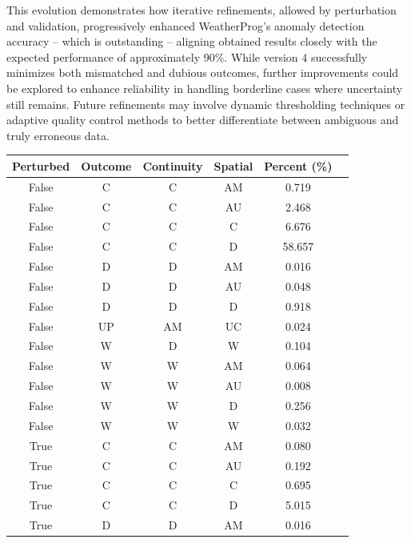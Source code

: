 \documentclass[authoryear,preprint,review,12pt]{elsarticle}
\newcommand{\statusblock}[3]{
    \ifthenelse{\equal{#2}{todo}}
        {\textcolor{red}{#1 (TO DO): #3}}
        {}
    \ifthenelse{\equal{#2}{wip}}
        {\textcolor{magenta}{#1 (IN PROGRESS): #3}}
        {}
    \ifthenelse{\equal{#2}{update}}
        {\textcolor{blue}{#1 (UPDATE): #3}}
        {}
    \ifthenelse{\equal{#2}{review}}
        {\textcolor{cyan}{#1 (REVIEW): #3}}
        {}
    \ifthenelse{\equal{#2}{done}}
        {\textcolor{PineGreen}{#1 (READY): #3}}
        {}
}
\begin{document}
This evolution demonstrates how iterative refinements, allowed by perturbation and validation, progressively enhanced WeatherProg's anomaly detection accuracy -- which is outstanding -- aligning obtained results closely with the expected performance of approximately 90\%.
While version 4 successfully minimizes both mismatched and dubious outcomes, further improvements could be explored to enhance reliability in handling borderline cases where uncertainty still remains.
Future refinements may involve dynamic thresholding techniques or adaptive quality control methods to better differentiate between ambiguous and truly erroneous data.

\begin{table}[]
\centering
\begin{scriptsize}
    \begin{tabular}{cccccc}
        \toprule
        Perturbed & Outcome & Continuity & Spatial & Percent (\%) \\
        \midrule
        False & C  & C  & AM & 0.719  \\
        False & C  & C  & AU & 2.468  \\
        False & C  & C  & C  & 6.676  \\
        False & C  & C  & D  & 58.657 \\
        False & D  & D  & AM & 0.016  \\
        False & D  & D  & AU & 0.048  \\
        False & D  & D  & D  & 0.918  \\
        False & UP & AM & UC & 0.024  \\
        False & W  & D  & W  & 0.104  \\
        False & W  & W  & AM & 0.064  \\
        False & W  & W  & AU & 0.008  \\
        False & W  & W  & D  & 0.256  \\
        False & W  & W  & W  & 0.032  \\
        True  & C  & C  & AM & 0.080  \\
        True  & C  & C  & AU & 0.192  \\
        True  & C  & C  & C  & 0.695  \\
        True  & C  & C  & D  & 5.015  \\
        True  & D  & D  & AM & 0.016  \\

\end{tabular}
\end{scriptsize}
\end{table}
\end{document}
